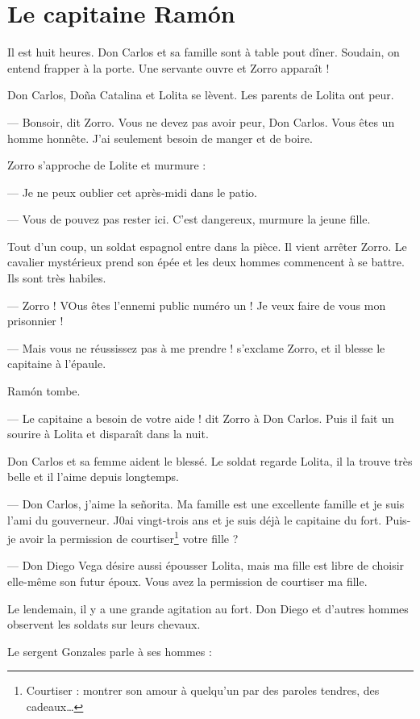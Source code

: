 \chapter{Le capitaine Ramón}
Il est huit heures. Don Carlos et sa famille sont à table pout dîner. Soudain, on entend frapper à la porte. Une servante ouvre et
Zorro apparaît !

Don Carlos, Doña Catalina et Lolita se lèvent. Les parents de Lolita ont peur.

--- Bonsoir, dit Zorro. Vous ne devez pas avoir peur, Don Carlos. Vous êtes un homme honnête. J'ai seulement besoin de manger et
    de boire.

Zorro s'approche de Lolite et murmure :

--- Je ne peux oublier cet après-midi dans le patio.

--- Vous de pouvez pas rester ici. C'est dangereux, murmure la jeune fille.

Tout d'un coup, un soldat espagnol entre dans la pièce. Il vient arrêter Zorro. Le cavalier mystérieux prend son épée et les deux
hommes commencent à se battre. Ils sont très habiles.

--- Zorro ! VOus êtes l'ennemi public numéro un ! Je veux faire de vous mon prisonnier !

--- Mais vous ne réussissez pas à me prendre ! s'exclame Zorro, et il blesse le capitaine à l'épaule.

Ramón tombe.

--- Le capitaine a besoin de votre aide ! dit Zorro à Don Carlos. Puis il fait un sourire à Lolita et disparaît dans la nuit.

Don Carlos et sa femme aident le blessé. Le soldat regarde Lolita, il la trouve très belle et il l'aime depuis longtemps.

--- Don Carlos, j'aime la señorita. Ma famille est une excellente famille et je suis l'ami du gouverneur. J0ai vingt-trois ans et
    je suis déjà le capitaine du fort. Puis-je avoir la permission de courtiser\footnote{Courtiser : montrer son amour à quelqu'un
    par des paroles tendres, des cadeaux\ldots{}} votre fille ?

--- Don Diego Vega désire aussi épousser Lolita, mais ma fille est libre de choisir elle-même son futur époux. Vous avez la
    permission de courtiser ma fille.

Le lendemain, il y a une grande agitation au fort. Don Diego et d'autres hommes observent les soldats sur leurs chevaux.

Le sergent Gonzales parle à ses hommes :

